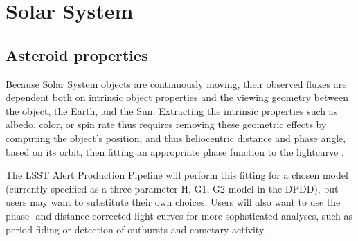 \documentclass[DM,authoryear,toc]{lsstdoc}
\begin{document}
\section{Solar System}

\subsection{Asteroid properties}

Because Solar System objects are continuously moving, their observed fluxes
are dependent both on intrinsic object properties and the viewing geometry
between the object, the Earth, and the Sun. Extracting the intrinsic
properties such as albedo, color, or spin rate thus requires removing these
geometric effects by computing the object's position, and thus heliocentric
distance and phase angle, based on its orbit, then fitting an appropriate
phase function to the lightcurve \citep{2010Icar..209..542M}.

The LSST Alert Production Pipeline will perform this fitting for a chosen
model (currently specified as a three-parameter H, G1, G2 model in the DPDD),
but users may want to substitute their own choices. Users will also want to
use the phase- and distance-corrected light curves for more sophsticated
analyses, such as period-fiding or detection of outbursts and cometary activity.
\end{document}
